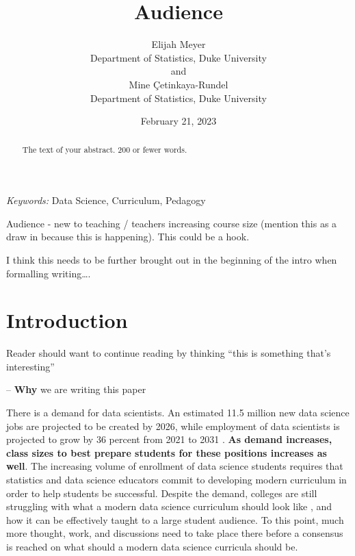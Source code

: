\documentclass[
  12pt]{article}
\begin{document}
\def\spacingset#1{\renewcommand{\baselinestretch}%
{#1}\small\normalsize} \spacingset{1}



\date{February 21, 2023}
\title{\bf Audience}
\author{
Elijah Meyer\\
Department of Statistics, Duke University\\
and\\Mine Çetinkaya-Rundel\\
Department of Statistics, Duke University\\
}
\maketitle

\bigskip
\bigskip
\begin{abstract}
The text of your abstract. 200 or fewer words.
\end{abstract}

\noindent%
{\it Keywords:} Data Science, Curriculum, Pedagogy
\vfill

\newpage
\spacingset{1.9} %
\ifdefined\Shaded\renewenvironment{Shaded}{\begin{tcolorbox}[breakable, frame hidden, boxrule=0pt, borderline west={3pt}{0pt}{shadecolor}, sharp corners, interior hidden, enhanced]}{\end{tcolorbox}}\fi

Audience - new to teaching / teachers increasing course size (mention
this as a draw in because this is happening). This could be a hook.

I think this needs to be further brought out in the beginning of the
intro when formalling writing\ldots.

\hypertarget{sec-intro}{%
\section{Introduction}\label{sec-intro}}

Reader should want to continue reading by thinking ``this is something
that's interesting''

-- \textbf{Why} we are writing this paper

There is a demand for data scientists. An estimated 11.5 million new
data science jobs are projected to be created by 2026, while employment
of data scientists is projected to grow by 36 percent from 2021 to 2031
\citep{labor_2022}. \textbf{As demand increases, class sizes to best
prepare students for these positions increases as well}. The increasing
volume of enrollment of data science students \citep{Redmond2022}
requires that statistics and data science educators commit to developing
modern curriculum in order to help students be successful. Despite the
demand, colleges are still struggling with what a modern data science
curriculum should look like \citep{Schwab2020}, and how it can be
effectively taught to a large student audience. To this point, much more
thought, work, and discussions need to take place there before a
consensus is reached on what should a modern data science curricula
should be.
\end{document}
